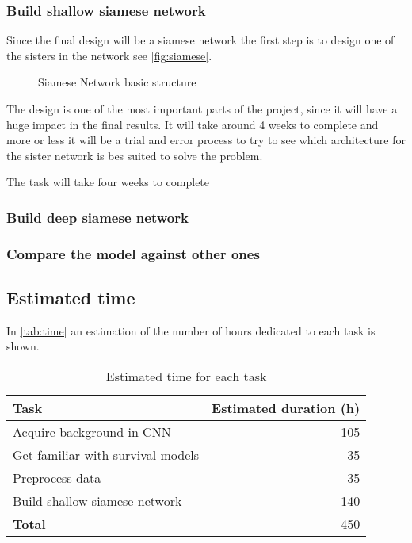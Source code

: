 \subsubsection{Build shallow siamese network}

Since the final design will be a siamese network the first step is to design one of the 
sisters in the network see \autoref{fig:siamese}. 

\begin{figure}
  \centering
  
  \caption{Siamese Network basic structure \label{fig:siamese}}
\end{figure}

The design is one of the most important parts of the project, since it will have a huge
impact in the final results. It will take around 4 weeks to complete and more or less
it will be a trial and error process to try to see which architecture for the sister
network is bes suited to solve the problem.

The task will take four weeks to complete

\subsubsection{Build deep siamese network}

\subsubsection{Compare the model against other ones}

\subsection{Estimated time}

In \autoref{tab:time} an estimation of the number of hours dedicated to each task is shown.

\begin{table}
  \centering{}
  \begin{tabular}{|l|r|}
    \hline
    Task & Estimated duration (h) \\ \hline \hline
    Acquire background in CNN & 105 \\ \hline
    Get familiar with survival models & 35 \\ \hline
    Preprocess data & 35 \\ \hline
    Build shallow siamese network & 140 \\
  
    \hline \hline
    \textbf{Total} & 450 \\
    \hline
  \end{tabular}
  \caption{Estimated time for each task \label{tab:time}}
\end{table}

